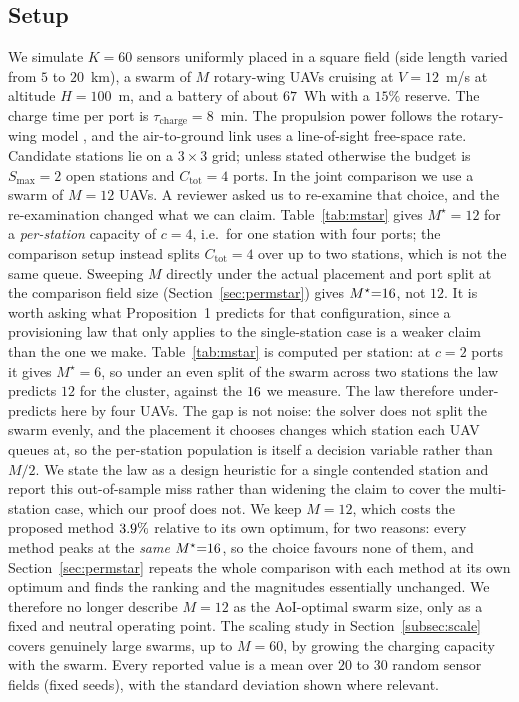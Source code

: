 \subsection{Setup}
We simulate $K{=}60$ sensors uniformly placed in a square field (side length
varied from $5$ to $20$~km), a swarm of $M$ rotary-wing UAVs cruising at
$V{=}12$~m/s at altitude $H{=}100$~m, and a battery of about $67$~Wh with a
$15\%$ reserve. The charge time per port is $\tau_{\mathrm{charge}}{=}8$~min. The
propulsion power follows the rotary-wing model \cite{zeng2019energy}, and the
air-to-ground link uses a line-of-sight free-space rate. Candidate stations lie
on a $3{\times}3$ grid; unless stated otherwise the budget is $S_{\max}{=}2$
open stations and $C_{\mathrm{tot}}{=}4$ ports. In the joint comparison we use a swarm of $M{=}12$ UAVs. A reviewer asked us to
re-examine that choice, and the re-examination changed what we can claim.
Table~\ref{tab:mstar} gives $M^\star{=}12$ for a \emph{per-station} capacity of
$c{=}4$, i.e.\ for one station with four ports; the comparison setup instead splits
$C_{\mathrm{tot}}{=}4$ over up to two stations, which is not the same queue. Sweeping
$M$ directly under the actual placement and port split at the comparison field size
(Section~\ref{sec:permstar}) gives $M^\star{=}16$, not $12$. It is worth asking what Proposition~1 predicts for that configuration, since a provisioning law that only applies to the single-station case is a weaker claim than the one we make. Table~\ref{tab:mstar} is computed per station: at $c{=}2$ ports it gives $M^\star{=}6$, so under an even split of the swarm across two stations the law predicts $12$ for the cluster, against the $16$ we measure. The law therefore under-predicts here by four UAVs. The gap is not noise: the solver does not split the swarm evenly, and the placement it chooses changes which station each UAV queues at, so the per-station population is itself a decision variable rather than $M/2$. We state the law as a design heuristic for a single contended station and report this out-of-sample miss rather than widening the claim to cover the multi-station case, which our proof does not. We keep $M{=}12$,
which costs the proposed method $3.9\%$ relative to its own optimum, for
two reasons: every method peaks at the \emph{same} $M^\star{=}16$, so the
choice favours none of them, and Section~\ref{sec:permstar} repeats the whole
comparison with each method at its own optimum and finds the ranking and the
magnitudes essentially unchanged. We therefore no longer describe $M{=}12$ as the
AoI-optimal swarm size, only as a fixed and neutral operating point. The scaling study in
Section~\ref{subsec:scale} covers genuinely large swarms, up to $M{=}60$, by
growing the charging capacity with the swarm. Every reported value is a mean over
$20$ to $30$ random sensor fields (fixed seeds), with the standard deviation
shown where relevant.


